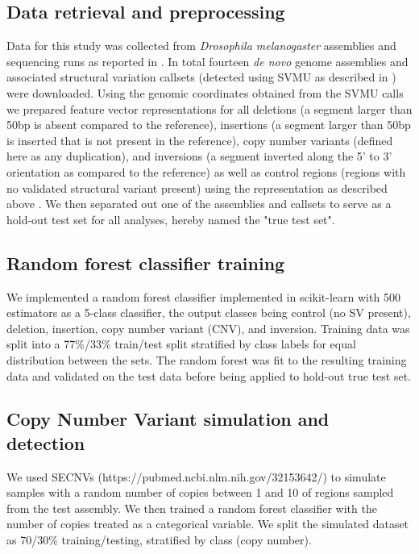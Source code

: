 

\subsection{Data retrieval and preprocessing}
Data for this study was collected from \textit{Drosophila melanogaster} assemblies and sequencing runs as reported in \cite{chakrabortyEvolutionGenomeStructure2021,chakrabortyHiddenGeneticVariation2018,chakrabortyStructuralVariantsExhibit2019}. In total fourteen \textit{de novo} genome assemblies and associated structural variation callsets (detected using SVMU as described in \cite{chakrabortyStructuralVariantsExhibit2019}) were downloaded. Using the genomic coordinates obtained from the SVMU calls we prepared feature vector representations for all deletions (a segment larger than 50bp is absent compared to the reference), insertions (a segment larger than 50bp is inserted that is not present in the reference), copy number variants (defined here as any duplication), and inversions (a segment inverted along the 5' to 3' orientation as compared to the reference) as well as control regions (regions with no validated structural variant present) using the representation as described above \cite{chakrabortyHiddenGeneticVariation2018}. We then separated out one of the assemblies and callsets to serve as a hold-out test set for all analyses, hereby named the "true test set".

\subsection{Random forest classifier training}

We implemented a random forest classifier implemented in scikit-learn with 500 estimators as a 5-class classifier, the output classes being control (no SV present), deletion, insertion, copy number variant (CNV), and inversion. Training data was split into a 77\%/33\% train/test split stratified by class labels for equal distribution between the sets. The random forest was fit to the resulting training data and validated on the test data before being applied to hold-out true test set.

\subsection{Copy Number Variant simulation and detection}

We used SECNVs (https://pubmed.ncbi.nlm.nih.gov/32153642/) to simulate samples with a random number of copies between 1 and 10 of regions sampled from the test assembly. We then trained a random forest classifier with the number of copies treated as a categorical variable. We split the simulated dataset as 70/30\% training/testing, stratified by class (copy number).

